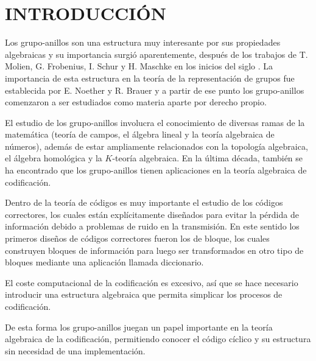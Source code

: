 \chapter{INTRODUCCIÓN}
Los grupo-anillos son una estructura muy interesante por sus propiedades algebraicas y su importancia surgió aparentemente, después de los trabajos de T. Molien, G. Frobenius, I. Schur y H. Maschke en los inicios del siglo . La importancia de esta estructura en la teoría de la representación de grupos fue establecida por E. Noether y R. Brauer y a partir de ese punto los grupo-anillos comenzaron a ser estudiados como materia aparte por derecho propio. 

El estudio de los grupo-anillos involucra el conocimiento de diversas ramas de la matemática (teoría de campos, el álgebra lineal y la teoría algebraica de números), además de estar ampliamente relacionados con la topología algebraica, el álgebra homológica y la $K$-teoría algebraica. En la última década, también se ha encontrado que los grupo-anillos tienen aplicaciones en la teoría algebraica de codificación.

Dentro de la teoría de códigos es muy importante el estudio de los códigos correctores, los cuales están explícitamente diseñados para evitar la pérdida de información debido a problemas de ruido en la transmisión. En este sentido los primeros diseños de códigos correctores fueron los de bloque, los cuales construyen bloques de información para luego ser transformados en otro tipo de bloques mediante una aplicación llamada diccionario. 

El coste computacional de la codificación es excesivo, así que se hace necesario introducir una estructura algebraica que permita simplicar los procesos de codificación. 

\newpage De esta forma los grupo-anillos juegan un papel importante en la teoría algebraica de la codificación, permitiendo conocer el código cíclico y su estructura sin necesidad de una implementación.


